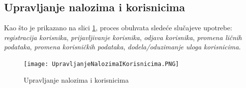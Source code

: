 \documentclass[a4paper]{article}
\begin{document}

\subsection{Upravljanje nalozima i korisnicima}
\label{subsection:upravljanjenalozimaikorisnicimasec}
Kao što je prikazano na slici \ref{fig:upravljanjenalozimaikorisnicima}, proces obuhvata sledeće slučajeve upotrebe: \textit{registracija korisnika}, \textit{prijavljivanje korisnika}, \textit{odjava korisnika}, \textit{promena ličnih podataka}, \textit{promena korisničkih podataka}, \textit{dodela/oduzimanje uloga korisnicima}.
\begin{figure}[h!]
    \centering
    \texttt{[image: UpravljanjeNalozimaIKorisnicima.PNG]}
    \caption{Upravljanje nalozima i korisnicima \cite{alex} \cite{vparadigm}}
    \label{fig:upravljanjenalozimaikorisnicima}
\end{figure}
\end{document}
